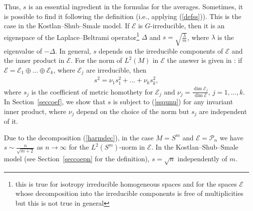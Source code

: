 \documentclass[10pt]{amsart}
\theoremstyle{remark}
\begin{document}
Thus, $s$ is an essential ingredient in the formulas for the
averages.  Sometimes, it is possible to find it following the
definition (i.e., applying (\ref{defss})). This is the case in the
Kostlan--Shub--Smale model. If ${\mathcal{E}}$ is $G$-irreducible, then it
is an eigenspace of the Laplace--Beltrami operator\footnote{this
is true for isotropy irreducible homogeneous spaces and for the
spaces ${\mathcal{E}}$ whose decomposition into the irreducible components
is free of multiplicities but this is not true in general}
${{\mathord{\Delta}}}$ and $s=\sqrt{\frac{{\mathord{\lambda}}}{m}}$, where ${{\mathord{\lambda}}}$ is the
eigenvalue of $-{{\mathord{\Delta}}}$. In general, $s$ depends on the irreducible
components of ${\mathcal{E}}$ and the inner product in ${\mathcal{E}}$. For the norm
of $L^2(M)$ in ${\mathcal{E}}$  the answer is given in \cite[Lemma~1]{Gi13}:
if ${\mathcal{E}}={\mathcal{E}}_1\oplus\dots\oplus{\mathcal{E}}_k$, where ${\mathcal{E}}_j$ are
irreducible, then
\begin{eqnarray}\label{ssqunu}
s^2=\nu_1s_1^2+\dots+\nu_ks_k^2,
\end{eqnarray}
where $s_j$ is the coefficient of metric homothety for ${\mathcal{E}}_j$ and
$\nu_j=\frac{\dim{\mathcal{E}}_j}{\dim{\mathcal{E}}}$, $j=1,\dots,k$.
In Section~\ref{seccoef}, we show that $s$ is subject to
(\ref{ssqunu}) for any invariant inner product, where $\nu_j$
depend on the choice of the norm but $s_j$ are independent of it.

Due to the decomposition (\ref{harmdec}), in the case $M=S^m$ and
${\mathcal{E}}={\mathcal{P}}_n$  we have $s\sim\frac{n}{\sqrt{m+2}}$ as $n\to\infty$
for the $L^2(S^m)$-norm in ${\mathcal{E}}$. In the Kostlan--Shub--Smale
model (see Section~\ref{seccoepn} for the definition),
$s=\sqrt{n}$ independently of $m$.
\end{document}
